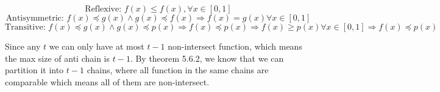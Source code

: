 \documentclass{article}
\def\implies{\Longrightarrow}
\begin{document}
    
    $$\text{Reflexive: } f(x) \le f(x), \forall x \in [0,1]$$
    $$\text{Antisymmetric: } f(x) \preceq g(x) \land g(x) \preceq f(x) \implies f(x) = g(x) \forall x \in [0,1]$$
    $$\text{Transitive: }f(x) \preceq g(x) \land g(x)  \preceq p(x) \implies f(x) \preceq p(x) \implies f(x) \ge p(x) \forall x \in [0, 1] \implies f(x) \preceq p(x)$$

    Since any $t$ we can only have at most $t - 1$ non-intersect function, which means the max size of anti chain is $t - 1$. By theorem 5.6.2, we know that we can partition it into $t - 1$ chains, where all function in the same chains are comparable which means all of them are non-intersect. 

    
\end{document}
